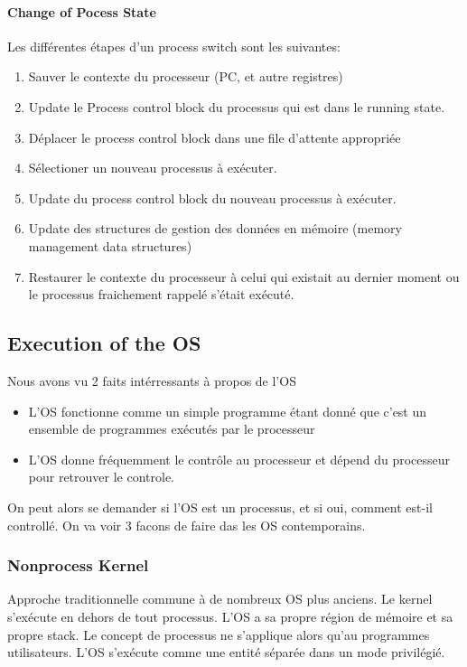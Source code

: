 \paragraph{Change of Pocess State}
Les différentes étapes d'un process switch sont les suivantes:
\begin{enumerate}
  \item Sauver le contexte du processeur (PC, et autre registres)
  \item Update le Process control block du processus qui est dans le running state.
  \item Déplacer le process control block dans une file d'attente appropriée
  \item Sélectioner un nouveau processus à exécuter.
  \item Update du process control block du nouveau processus à exécuter.
  \item Update des structures de gestion des données en mémoire (memory management data structures)
  \item Restaurer le contexte du processeur à celui qui existait au dernier moment ou le processus fraichement rappelé s'était exécuté.
\end{enumerate}

\subsection{Execution of the OS}
Nous avons vu 2 faits intérressants à propos de l'OS
\begin{itemize}
  \item L'OS fonctionne comme un simple programme étant donné que c'est un ensemble de programmes exécutés par le processeur
  \item L'OS donne fréquemment le contrôle au processeur et dépend du processeur pour retrouver le controle.
\end{itemize}
On peut alors se demander si l'OS est un processus, et si oui, comment est-il controllé. On va voir 3 facons de faire das les OS contemporains.

\subsubsection{Nonprocess Kernel}
Approche traditionnelle commune à de nombreux OS plus anciens. Le kernel s'exécute en dehors de tout processus. L'OS a sa propre région de mémoire et sa propre stack. Le concept de processus ne s'applique alors qu'au programmes utilisateurs. L'OS s'exécute comme une entité séparée dans un mode privilégié.

